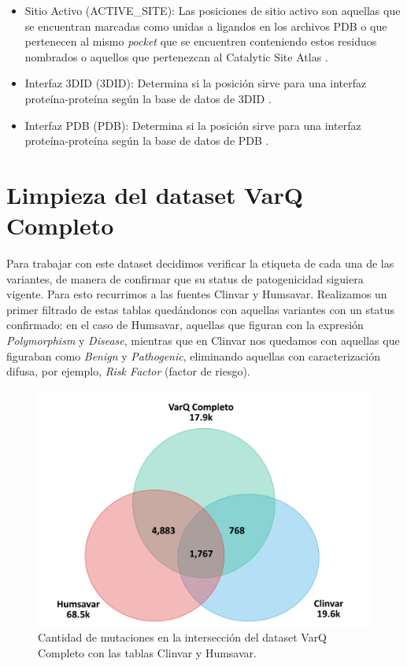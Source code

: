 \begin{itemize}
    \item Sitio Activo (ACTIVE\_SITE): Las posiciones de sitio activo son aquellas que se encuentran marcadas como unidas a ligandos en los archivos PDB o que pertenecen al mismo \textit{pocket} que se encuentren conteniendo estos residuos nombrados o aquellos que pertenezcan al Catalytic Site Atlas \cite{Porter2004}.
    \item Interfaz 3DID (3DID): Determina si la posición sirve para una interfaz proteína-proteína según la base de datos de 3DID \cite{Stein2005}.
    \item Interfaz PDB (PDB): Determina si la posición sirve para una interfaz proteína-proteína según la base de datos de PDB \cite{Berman2003}.
\end{itemize}


\section{Limpieza del dataset VarQ Completo}

Para trabajar con este dataset decidimos verificar la etiqueta de cada una de las variantes, de manera de confirmar que su status de patogenicidad siguiera vigente. Para esto recurrimos a las fuentes Clinvar y Humsavar. Realizamos un primer filtrado de estas tablas quedándonos con aquellas variantes con un status confirmado: en el caso de Humsavar, aquellas que figuran con la expresión \textit{Polymorphism} y \textit{Disease}, mientras que en Clinvar nos quedamos con aquellas que figuraban como \textit{Benign} y \textit{Pathogenic}, eliminando aquellas con caracterización difusa, por ejemplo, \textit{Risk Factor} (factor de riesgo). 

\begin{figure}[H]
    \centering
    \includegraphics[scale=0.4]{documents/latex/figures/3/varq/interseccion_varq.pdf}
    \caption{Cantidad de mutaciones en la intersección del dataset VarQ Completo con las tablas Clinvar y Humsavar.}
    \label{fig:interseccion_varq}
\end{figure}

